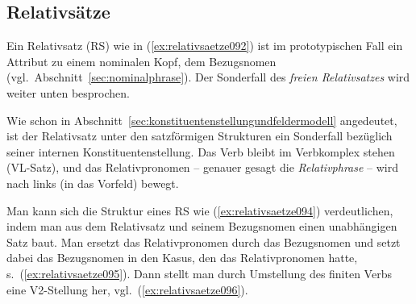 \begin{exe}
  \ex\label{ex:nebensaetze089}
  \begin{xlist}
  \end{xlist}
\end{exe}

\subsection{Relativsätze}
\label{sec:relativsaetze}

Ein Relativsatz (RS) wie in (\ref{ex:relativsaetze092}) ist im prototypischen Fall ein Attribut zu einem nominalen Kopf, dem Bezugsnomen (vgl.\ Abschnitt~\ref{sec:nominalphrase}).
Der Sonderfall des \textit{freien Relativsatzes} wird weiter unten besprochen.

\begin{exe}
\end{exe}

Wie schon in Abschnitt~\ref{sec:konstituentenstellungundfeldermodell} angedeutet, ist der Relativsatz unter den satzförmigen Strukturen ein Sonderfall bezüglich seiner internen Konstituentenstellung.
Das Verb bleibt im Verbkomplex stehen (VL-Satz), und das Relativpronomen -- genauer gesagt die \textit{Relativphrase} -- wird nach links (in das Vorfeld) bewegt.

Man kann sich die Struktur eines RS wie (\ref{ex:relativsaetze094}) verdeutlichen, indem man aus dem Relativsatz und seinem Bezugsnomen einen unabhängigen Satz baut.
Man ersetzt das Relativpronomen durch das Bezugsnomen und setzt dabei das Bezugsnomen in den Kasus, den das Relativpronomen hatte, s.\ (\ref{ex:relativsaetze095}).
Dann stellt man durch Umstellung des finiten Verbs eine V2-Stellung her, vgl.\ (\ref{ex:relativsaetze096}).

\begin{exe}
  \ex\label{ex:relativsaetze093}
  \begin{xlist}
  \end{xlist}
\end{exe}

